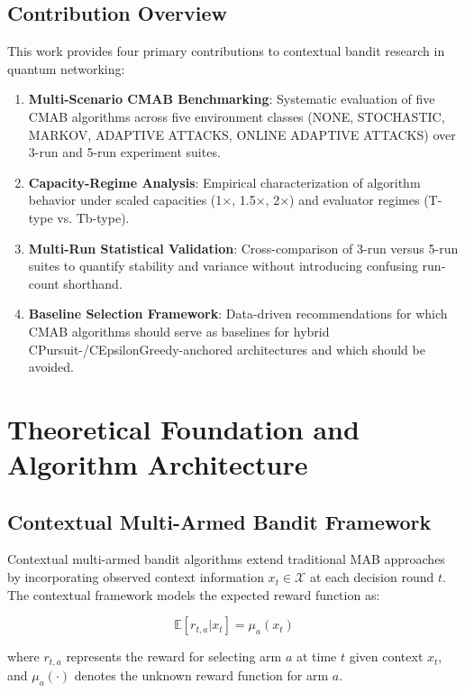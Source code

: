 \documentclass[12pt,a4paper]{article}
\begin{document}
\subsection{Contribution Overview}

This work provides four primary contributions to contextual bandit research in quantum networking:

\begin{enumerate}
\item \textbf{Multi-Scenario CMAB Benchmarking}: Systematic evaluation of five CMAB algorithms across five environment classes (NONE, STOCHASTIC, MARKOV, ADAPTIVE ATTACKS, ONLINE ADAPTIVE ATTACKS) over 3-run and 5-run experiment suites.
\item \textbf{Capacity-Regime Analysis}: Empirical characterization of algorithm behavior under scaled capacities (1$\times$, 1.5$\times$, 2$\times$) and evaluator regimes (T-type vs. Tb-type).
\item \textbf{Multi-Run Statistical Validation}: Cross-comparison of 3-run versus 5-run suites to quantify stability and variance without introducing confusing run-count shorthand.
\item \textbf{Baseline Selection Framework}: Data-driven recommendations for which CMAB algorithms should serve as baselines for hybrid CPursuit-/CEpsilonGreedy-anchored architectures and which should be avoided.
\end{enumerate}

\newpage
\section{Theoretical Foundation and Algorithm Architecture}

\subsection{Contextual Multi-Armed Bandit Framework}

Contextual multi-armed bandit algorithms extend traditional MAB approaches by incorporating observed context information $x_t \in \mathcal{X}$ at each decision round $t$. The contextual framework models the expected reward function as:

\begin{equation}
\mathbb{E}[r_{t,a} | x_t] = \mu_a(x_t)
\end{equation}

where $r_{t,a}$ represents the reward for selecting arm $a$ at time $t$ given context $x_t$, and $\mu_a(\cdot)$ denotes the unknown reward function for arm $a$.
\end{document}
